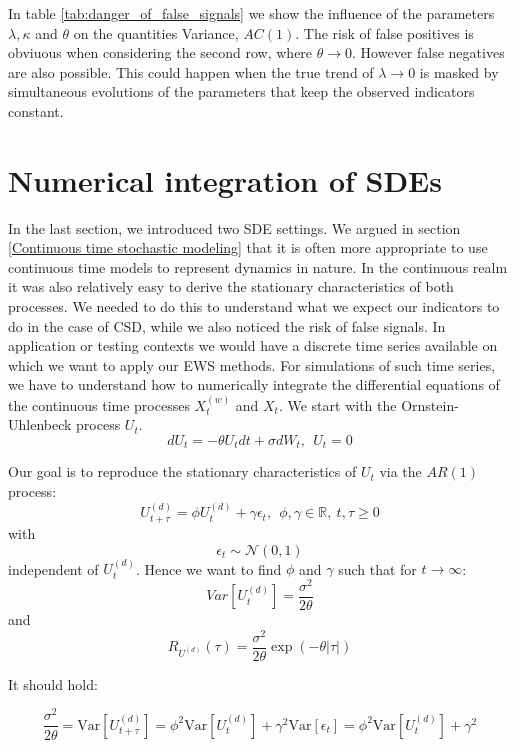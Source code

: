 \documentclass[%
thesis=student,%
coverpage=false,%
titlepage=false,%
headmarks=true, %
english,%
font=libertine, %
math=newpxtx, %
BCOR=5mm,%
coverBCOR=11mm%
]{tumbook}
\begin{document}
In table \ref{tab:danger_of_false_signals} we show the influence of the parameters $\lambda, \kappa$ and $\theta$ on the quantities Variance, $AC(1)$. The risk of false positives is obviuous when considering the second row, where $\theta \rightarrow 0$. However false negatives are also possible. This could happen when the true trend of $\lambda \rightarrow 0$ is masked by simultaneous evolutions of the parameters that keep the observed indicators constant.






\chapter{Numerical integration of SDEs}

In the last section, we introduced two SDE settings. We argued in section \ref{Continuous time stochastic modeling} that it is often more appropriate to use continuous time models to represent dynamics in nature. In the continuous realm it was also relatively easy to derive the stationary characteristics of both processes. We needed to do this to understand what we expect our indicators to do in the case of CSD, while we also noticed the risk of false signals. 
In application or testing contexts we would have a discrete time series available on which we want to apply our EWS methods. For simulations of such time series, we have to understand how to numerically integrate the differential equations of the continuous time processes $X_{t}^{(w)}$ and $X_{t}$. We start with the Ornstein-Uhlenbeck process $U_{t}$.
\[
dU_{t} = -\theta U_{t}dt + \sigma dW_{t}, \ \ U_{t} = 0
\]

Our goal is to reproduce the stationary characteristics of $U_{t}$  via the $AR(1)$ process:
\[
     U_{t+\tau}^{(d)} = \phi U_{t} ^{(d)}+ \gamma \epsilon_{t}, \ \ \phi, \gamma \in \mathbb{R}, \ t,\tau \geq 0
\]
with 
\[
\epsilon_{t} \sim \mathcal{N}(0,1)
\]
independent of $U_{t}^{(d)}$.
Hence we want to find $\phi$ and $\gamma$ such that for $t \rightarrow \infty$:
\[
Var[U_{t}^{(d)}] = \frac{\sigma^{2}}{2\theta}
\]
and 
\[
R_{U^{(d)}}(\tau) = \frac{\sigma ^2}{2\theta}\exp(-\theta\lvert \tau \rvert)
\]

It should hold:

\begin{equation*}
    \frac{\sigma^2}{2\theta} = \text{Var}[U_{t+\tau} ^{(d)}] = \phi ^2 \text{Var}[U_{t} ^{(d)}] + \gamma ^2 \text{Var}[\epsilon_{t}] = \phi ^2 \text{Var}[U_{t} ^{(d)}] + \gamma ^2
\end{equation*}
\end{document}
